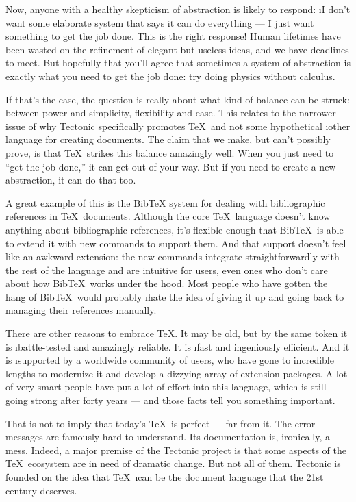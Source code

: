 Now, anyone with a healthy skepticism of abstraction is likely to respond: \i{I
don't want some elaborate system that says it can do everything — I just want
something to get the job done}. This is the right response! Human lifetimes have
been wasted on the refinement of elegant but useless ideas, and we have
deadlines to meet. But hopefully that you'll agree that sometimes a system of
abstraction is exactly what you need to get the job done: try doing physics
without calculus.

If that's the case, the question is really about what kind of balance can be
struck: between power and simplicity, flexibility and ease. This relates to the
narrower issue of why Tectonic specifically promotes \TeX\ and not some
hypothetical \i{other} language for creating documents. The claim that we make,
but can't possibly prove, is that \TeX\ strikes this balance amazingly well.
When you just need to ``get the job done,'' it can get out of your way. But if
you need to create a new abstraction, it can do that too.

A great example of this is the
\href{https://en.wikipedia.org/wiki/BibTeX}{Bib\TeX} system for dealing with
bibliographic references in \TeX\ documents. Although the core \TeX\ language
doesn't know anything about bibliographic references, it's flexible enough that
Bib\TeX\ is able to extend it with new commands to support them. And that
support doesn't feel like an awkward extension: the new commands integrate
straightforwardly with the rest of the language and are intuitive for users,
even ones who don't care about how Bib\TeX\ works under the hood. Most people
who have gotten the hang of Bib\TeX\ would probably \i{hate} the idea of giving
it up and going back to managing their references manually.

There are other reasons to embrace \TeX. It may be old, but by the same token it
is \i{battle-tested} and amazingly reliable. It is \i{fast} and ingeniously
efficient. And it is \i{supported} by a worldwide community of users, who have
gone to incredible lengths to modernize it and develop a dizzying array of
extension packages. A lot of very smart people have put a lot of effort into
this language, which is still going strong after forty years — and those facts
tell you something important.

That is not to imply that today's \TeX\ is perfect — far from it. The error
messages are famously hard to understand. Its documentation is, ironically, a
mess. Indeed, a major premise of the Tectonic project is that some aspects of
the \TeX\ ecosystem are in need of dramatic change. But not all of them.
Tectonic is founded on the idea that \TeX\ \i{can be} the document language that
the 21st century deserves.
